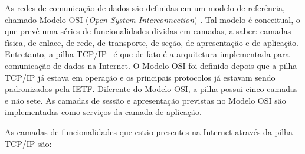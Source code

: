 \documentclass[	12pt, Times, openright, twoside, a4paper, english, brazil]{abntex2}
\begin{document}
As redes de comunicação de dados são definidas em um modelo de referência, chamado Modelo OSI (\textit{Open System Interconnection}) \cite{iso7498a}. Tal modelo é conceitual, o que prevê uma séries de funcionalidades dividas em camadas, a saber: camadas física, de enlace, de rede, de transporte, de seção, de apresentação e de aplicação. Entretanto, a pilha TCP/IP~\cite{rfc1122} é que de fato é a arquitetura implementada para comunicação de dados na Internet. O Modelo OSI foi definido depois que a pilha TCP/IP já estava em operação e os principais protocolos já estavam sendo padronizados pela IETF. Diferente do Modelo OSI, a pilha possui cinco camadas e não sete. As camadas de sessão e apresentação previstas no Modelo OSI são implementadas como serviços da camada de aplicação.

\par As camadas de funcionalidades que estão presentes na Internet através da pilha TCP/IP são:
\end{document}

